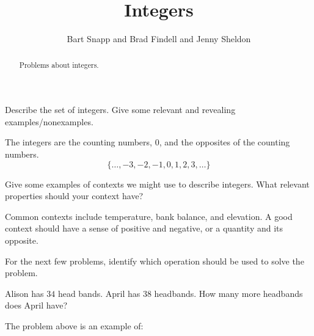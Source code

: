 \documentclass[nooutcomes]{ximera}
\title{Integers}
\author{Bart Snapp and Brad Findell and Jenny Sheldon}
\begin{document}
\begin{abstract}
Problems about integers.
\end{abstract}
\maketitle




\begin{problem}
Describe the set of integers. Give some relevant and revealing
  examples/nonexamples.
\begin{freeResponse}
\begin{hint}
The integers are the counting numbers, 0, and the opposites of the counting numbers.  
\[\{ \dots, -3, -2, -1, 0, 1, 2, 3, \dots\}\]
\end{hint}
\end{freeResponse}
\end{problem}

\begin{problem}
Give some examples of contexts we might use to describe integers. What relevant properties should your context have?
\begin{freeResponse}
\begin{hint}
Common contexts include temperature, bank balance, and elevation.  A good context should have a sense of positive and negative, or a quantity and its opposite.
\end{hint}
\end{freeResponse}
\end{problem}

For the next few problems, identify which operation should be used to solve the problem.

\begin{problem}
Alison has $34$ head bands.  April has $38$ headbands.  How many more headbands does April have?
\begin{prompt}
The problem above is an example of:
\begin{multipleChoice}
\end{multipleChoice}
\end{prompt}
\end{problem}
\end{document}
